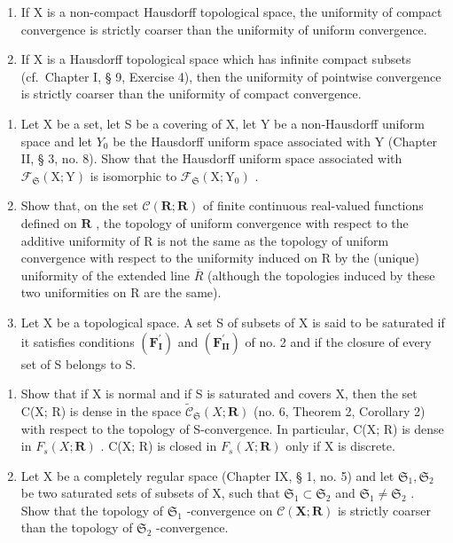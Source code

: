 \begin{enumerate}
\def\labelenumi{(\roman{enumi})}
\item
  If X is a non-compact Hausdorff topological space, the uniformity of compact convergence is strictly coarser than the uniformity of uniform convergence.
\item
  If X is a Hausdorff topological space which has infinite compact subsets (cf.~Chapter I, § 9, Exercise 4), then the uniformity of pointwise convergence is strictly coarser than the uniformity of compact convergence.
\end{enumerate}

\begin{enumerate}
\def\labelenumi{\arabic{enumi})}
\setcounter{enumi}{2}
\item
  Let X be a set, let S be a covering of X, let Y be a non-Hausdorff uniform space and let \(Y_{0}\) be the Hausdorff uniform space associated with Y (Chapter II, § 3, no. 8). Show that the Hausdorff uniform space associated with \(\mathcal{F}_{\mathfrak{S}}(\mathrm{X};\mathrm{Y})\) is isomorphic to \(\mathcal{F}_{\mathfrak{S}}(\mathrm{X};\mathrm{Y}_{0})\) .
\item
  Show that, on the set \(\mathcal{C}(\mathbf{R};\mathbf{R})\) of finite continuous real-valued functions defined on \(\mathbf{R}\) , the topology of uniform convergence with respect to the additive uniformity of R is not the same as the topology of uniform convergence with respect to the uniformity induced on R by the (unique) uniformity of the extended line \(\overline{R}\) (although the topologies induced by these two uniformities on R are the same).
\item
  Let X be a topological space. A set S of subsets of X is said to be saturated if it satisfies conditions \((\mathbf{F}_{\mathbf{I}}^{\prime})\) and \((\mathbf{F}_{\mathbf{II}}^{\prime})\) of no. 2 and if the closure of every set of S belongs to S.
\end{enumerate}

\begin{enumerate}
\def\labelenumi{\alph{enumi})}
\item
  Show that if X is normal and if S is saturated and covers X, then the set C(X; R) is dense in the space \(\tilde{\mathcal{C}}_{\mathfrak{S}}(X; \mathbf{R})\) (no. 6, Theorem 2, Corollary 2) with respect to the topology of S-convergence. In particular, C(X; R) is dense in \(F_{s}(X; \mathbf{R})\) . C(X; R) is closed in \(F_{s}(X; \mathbf{R})\) only if X is discrete.
\item
  Let X be a completely regular space (Chapter IX, § 1, no. 5) and let \(\mathfrak{S}_1, \mathfrak{S}_2\) be two saturated sets of subsets of X, such that \(\mathfrak{S}_1 \subset \mathfrak{S}_2\) and \(\mathfrak{S}_1 \neq \mathfrak{S}_2\) . Show that the topology of \(\mathfrak{S}_1\) -convergence on \(\mathcal{C}(\mathbf{X}; \mathbf{R})\) is strictly coarser than the topology of \(\mathfrak{S}_2\) -convergence.
\end{enumerate}

